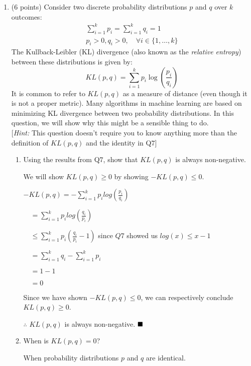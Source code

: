 \begin{enumerate}[resume]
\pagebreak
\item (6 points)
Consider two discrete probability distributions $p$ and $q$ over $k$ outcomes:
%
\begin{subequations}
\begin{align}
\sum_{i=1}^k p_i = \sum_{i=1}^k q_i=1 \\
p_i > 0, q_i > 0, \quad \forall i \in \{1,\ldots,k\}
\end{align}
\end{subequations}
%
The Kullback-Leibler (KL) divergence (also known as the \emph{relative entropy}) between these distributions is given by:
%
\begin{equation}
KL(p,q)=\sum_{i=1}^{k} p_i\log\left(\frac{p_i}{q_i}\right)
\end{equation}
%
It is common to refer to $KL(p,q)$ as a measure of distance (even though it is not a proper metric).
Many algorithms in machine learning are based on minimizing KL divergence between two
probability distributions.
In this question, we will show why this might be a sensible thing to do.\\

[\emph{Hint:} This question doesn't require you to know anything more than the definition of $KL(p,q)$ and the identity
in Q$7$]

\begin{enumerate}
\item Using the results from Q$7$, show that $KL(p,q)$ is always non-negative.

We will show $KL(p, q) \geq 0$ by showing $-KL(p, q) \leq 0$.

$-KL(p, q) = -\sum_{i=1}^{k} p_i log(\frac{p_i}{q_i})$

$\quad = \sum_{i=1}^{k} p_i log(\frac{q_i}{p_i})$

$\quad \leq \sum_{i=1}^{k} p_i (\frac{q_i}{p_i} - 1)$ since $Q7$ showed us $log(x) \leq x - 1$

$\quad = \sum_{i=1}^{k} q_i - \sum_{i=1}^{k} p_i$

$\quad = 1 - 1$

$\quad = 0$

Since we have shown $-KL(p, q) \leq 0$, we can respectively conclude $KL(p, q) \geq 0$.

$\therefore$ $KL(p, q)$ is always non-negative. $\hfill\ensuremath{\blacksquare}$

\pagebreak
\item When is $KL(p,q) = 0$?

When probability distributions $p$ and $q$ are identical.


\end{enumerate}
\end{enumerate}
